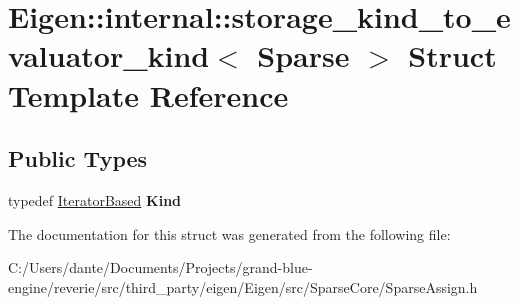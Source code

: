 \hypertarget{struct_eigen_1_1internal_1_1storage__kind__to__evaluator__kind_3_01_sparse_01_4}{}\section{Eigen\+::internal\+::storage\+\_\+kind\+\_\+to\+\_\+evaluator\+\_\+kind$<$ Sparse $>$ Struct Template Reference}
\label{struct_eigen_1_1internal_1_1storage__kind__to__evaluator__kind_3_01_sparse_01_4}
\subsection*{Public Types}
\begin{DoxyCompactItemize}
\item 
\mbox{\label{struct_eigen_1_1internal_1_1storage__kind__to__evaluator__kind_3_01_sparse_01_4_af851f49773d93da13d7f47cf5b97e65b}} 
typedef \mbox{\hyperlink{struct_eigen_1_1internal_1_1_iterator_based}{Iterator\+Based}} {\bfseries Kind}
\end{DoxyCompactItemize}


The documentation for this struct was generated from the following file\+:\begin{DoxyCompactItemize}
\item 
C\+:/\+Users/dante/\+Documents/\+Projects/grand-\/blue-\/engine/reverie/src/third\+\_\+party/eigen/\+Eigen/src/\+Sparse\+Core/Sparse\+Assign.\+h\end{DoxyCompactItemize}
